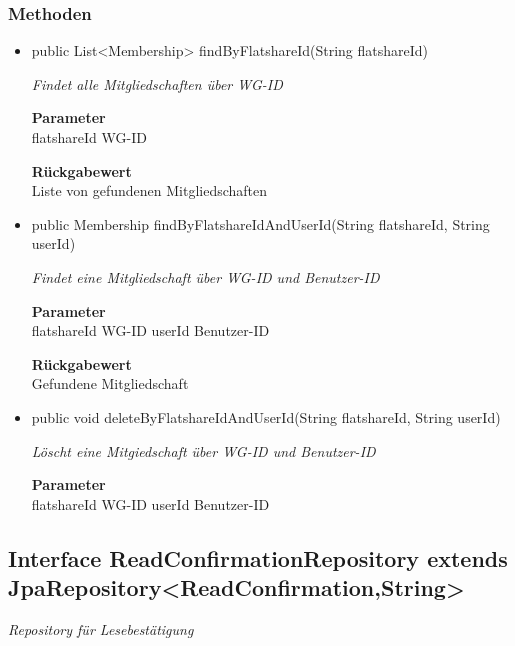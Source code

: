 \documentclass[a4paper]{scrreprt}
\begin{document}
        \subsubsection{Methoden}
        \begin{itemize}
        	\item{public List<Membership> findByFlatshareId(String flatshareId)}
        	
        	\textit{Findet alle Mitgliedschaften über WG-ID}
        	
        	\textbf{Parameter} \\
        	flatshareId WG-ID
        	
        	\textbf{Rückgabewert} \\
        	Liste von gefundenen Mitgliedschaften        \item{public Membership findByFlatshareIdAndUserId(String flatshareId, String userId)}
        	
        	\textit{Findet eine Mitgliedschaft über WG-ID und Benutzer-ID}
        	
        	\textbf{Parameter} \\
        	flatshareId WG-ID
        	userId Benutzer-ID
        	
        	\textbf{Rückgabewert} \\
        	Gefundene Mitgliedschaft        \item{public void deleteByFlatshareIdAndUserId(String flatshareId, String userId)}
        	
        	\textit{Löscht eine Mitgiedschaft über WG-ID und Benutzer-ID}
        	
        	\textbf{Parameter} \\
        	flatshareId WG-ID
        	userId Benutzer-ID
        	
        	
        \end{itemize}
        \subsection{Interface ReadConfirmationRepository extends JpaRepository<ReadConfirmation,String>}
        \textit{Repository für Lesebestätigung}
\end{document}
